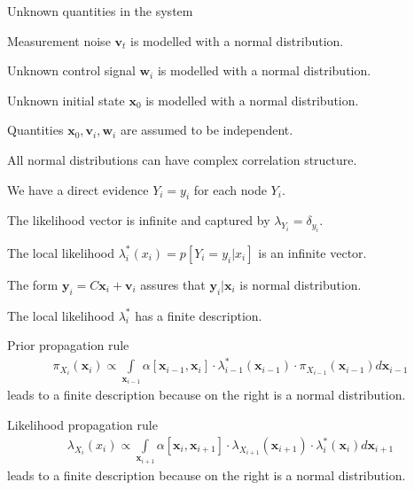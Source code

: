 \documentclass[landscape,footrule]{foils}
\renewcommand{\vec}[1]{\boldsymbol{#1}}
\begin{document}
Unknown quantities in the system
\begin{triangles}
\item Measurement noise $\vec{v}_t$ is modelled with a normal distribution.
\item Unknown control signal $\vec{w}_i$ is modelled with a normal distribution.
\item Unknown initial state $\vec{x}_0$ is modelled with a normal distribution.
\item Quantities $\vec{x}_0, \vec{v}_i, \vec{w}_i$ are assumed to be independent.
\item All normal distributions can have complex correlation structure.
\end{triangles}


\begin{triangles}
\item We have a direct evidence $Y_i=y_i$ for each node $Y_i$. 
\item The likelihood vector is infinite and captured by $\lambda_{Y_i}=\delta_{y_i}$.
\item The local likelihood $\lambda_i^*(x_i)=p[Y_i=y_i|x_i]$ is an infinite vector. 
\item The form $\vec{y}_{i}=C\vec{x}_i+\vec{v}_i$ assures that $\vec{y}_{i}|\vec{x}_i$ is normal distribution.
\item The local likelihood $\lambda_i^*$ has a finite description.
\end{triangles}


\enlargethispage{1cm}

\vspace*{-1.0cm}

Prior propagation rule
\begin{align*}
\pi_{X_i}(\vec{x}_i)\propto \int\limits_{\vec{x}_{i-1}} \alpha[\vec{x}_{i-1}, \vec{x}_i]\cdot\lambda_{i-1}^*(\vec{x}_{i-1})\cdot \pi_{X_{i-1}}(\vec{x}_{i-1})d\vec{x}_{i-1}
\end{align*}
leads to a finite description because on the right is a normal distribution. 


\enlargethispage{1cm}

\vspace*{-1.0cm}

Likelihood propagation rule
\begin{align*}
\lambda_{X_i}(x_i)\propto \int\limits_{\vec{x}_{i+1}} \alpha[\vec{x}_{i}, \vec{x}_{i+1}]\cdot\lambda_{X_{i+1}}(\vec{x}_{i+1})\cdot \lambda_{i}^*(\vec{x}_{i}) d\vec{x}_{i+1}
\end{align*}
leads to a finite description because on the right is a normal distribution. 
\end{document}
